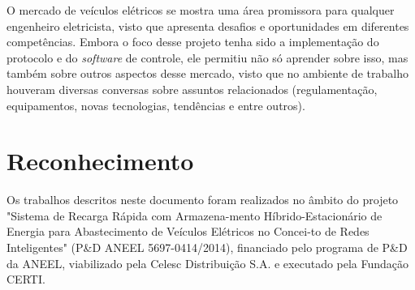   O mercado de veículos elétricos se mostra uma área promissora para qualquer engenheiro eletricista, visto que apresenta desafios e oportunidades em diferentes competências. Embora o foco desse projeto tenha sido a implementação do protocolo e do \textit{software} de controle, ele permitiu não só aprender sobre isso, mas também sobre outros aspectos desse mercado, visto que no ambiente de trabalho houveram diversas conversas sobre assuntos relacionados (regulamentação, equipamentos, novas tecnologias, tendências e entre outros).

  \section{Reconhecimento}
  
    Os trabalhos descritos neste documento foram realizados no âmbito do projeto "Sistema de Recarga Rápida com Armazena-mento Híbrido-Estacionário de Energia para Abastecimento de Veículos Elétricos no Concei-to de Redes Inteligentes" (P\&D ANEEL 5697-0414/2014), financiado pelo programa de P\&D da ANEEL, viabilizado pela Celesc Distribuição S.A. e executado pela Fundação CERTI.
  